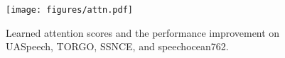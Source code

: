 \begin{figure}[t]
    \centering
    \texttt{[image: figures/attn.pdf]} 
    \caption{
    Learned attention scores and the performance improvement on UASpeech, TORGO, SSNCE, and speechocean762.
    }
    \label{fig:attn}
\end{figure}


   
